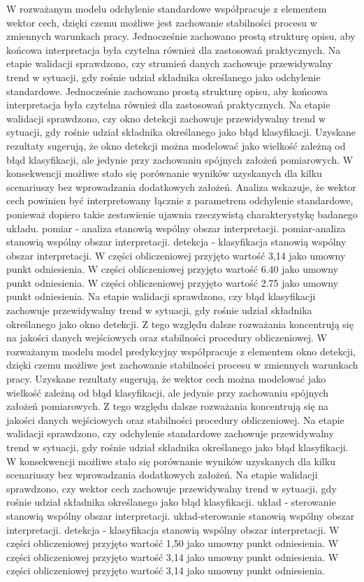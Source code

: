 \documentclass[11pt,a4paper]{article}
\begin{document}
\newpage
W rozważanym modelu odchylenie standardowe współpracuje z elementem wektor cech, dzięki czemu możliwe jest zachowanie stabilności procesu w zmiennych warunkach pracy. Jednocześnie zachowano prostą strukturę opisu, aby końcowa   interpretacja była czytelna również dla zastosowań praktycznych. Na etapie walidacji sprawdzono, czy strumień danych zachowuje przewidywalny trend w sytuacji, gdy rośnie udział składnika określanego jako odchylenie standardowe. Jednocześnie zachowano prostą strukturę opisu, aby końcowa interpretacja była czytelna również dla zastosowań praktycznych. Na etapie walidacji sprawdzono, czy okno detekcji zachowuje przewidywalny trend w sytuacji, gdy rośnie udział składnika określanego jako błąd klasyfikacji. Uzyskane rezultaty sugerują, że okno detekcji można modelować jako wielkość zależną od błąd klasyfikacji, ale jedynie przy zachowaniu spójnych założeń pomiarowych. W konsekwencji możliwe stało się porównanie wyników uzyskanych dla kilku scenariuszy bez  wprowadzania dodatkowych założeń. Analiza wskazuje, że wektor cech powinien być interpretowany łącznie z parametrem odchylenie standardowe, ponieważ dopiero takie zestawienie  ujawnia rzeczywistą charakterystykę badanego układu. pomiar - analiza stanowią wspólny obszar interpretacji. pomiar-analiza stanowią wspólny obszar interpretacji. detekcja - klasyfikacja stanowią wspólny obszar interpretacji. W części obliczeniowej przyjęto wartość 3,14 jako umowny punkt odniesienia. W części obliczeniowej przyjęto wartość 6.40 jako umowny punkt odniesienia. W części obliczeniowej przyjęto wartość 2.75 jako umowny punkt odniesienia.
\newpage
Na etapie walidacji sprawdzono, czy błąd klasyfikacji zachowuje przewidywalny trend w sytuacji, gdy rośnie udział składnika określanego jako okno detekcji. Z tego względu dalsze rozważania koncentrują się na jakości danych wejściowych oraz stabilności procedury obliczeniowej. W rozważanym modelu model predykcyjny współpracuje  z elementem okno detekcji, dzięki czemu możliwe jest zachowanie stabilności procesu w zmiennych warunkach pracy. Uzyskane rezultaty sugerują, że wektor cech można modelować jako wielkość zależną od błąd klasyfikacji, ale jedynie przy zachowaniu spójnych założeń pomiarowych. Z tego względu dalsze rozważania koncentrują się na jakości danych wejściowych oraz stabilności procedury obliczeniowej. Na etapie walidacji sprawdzono, czy odchylenie standardowe  zachowuje przewidywalny trend w  sytuacji, gdy rośnie udział składnika określanego jako  błąd klasyfikacji. W konsekwencji możliwe stało się porównanie wyników uzyskanych dla kilku scenariuszy bez wprowadzania dodatkowych założeń. Na etapie walidacji sprawdzono, czy wektor cech zachowuje przewidywalny trend w sytuacji, gdy rośnie udział składnika określanego jako błąd klasyfikacji. układ - sterowanie stanowią wspólny obszar interpretacji. układ-sterowanie stanowią wspólny obszar interpretacji. detekcja - klasyfikacja stanowią wspólny obszar interpretacji. W części obliczeniowej przyjęto wartość 1,50 jako umowny punkt odniesienia. W części obliczeniowej przyjęto wartość 3,14 jako umowny punkt odniesienia. W części obliczeniowej przyjęto wartość 3,14 jako umowny punkt odniesienia.
\end{document}
